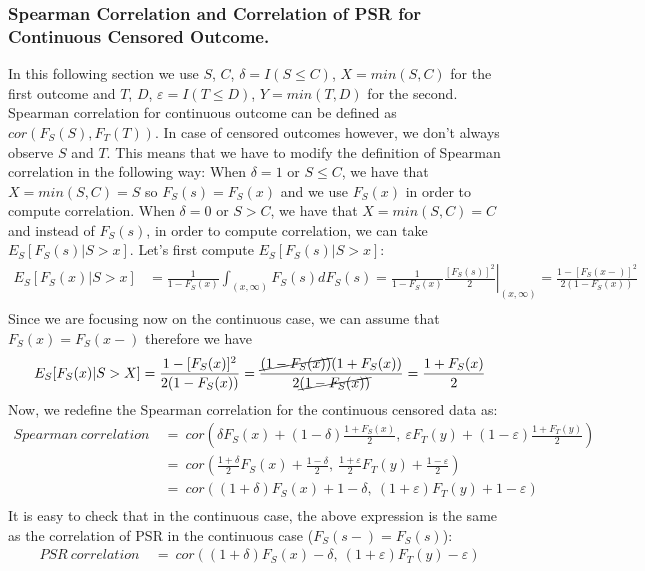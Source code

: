 \documentclass[]{article}
\let\epsilon\varepsilon
\begin{document}
\subsubsection{Spearman Correlation and Correlation of PSR for Continuous Censored Outcome.}
In this following section we use $S$, $C$, $\delta=I(S\leq C)$, $X = min(S, C)$ for the first outcome and $T$, $D$, $\epsilon=I(T\leq D)$, $Y = min(T, D)$ for the second.\\
Spearman correlation for continuous outcome can be defined as $cor(F_S(S), F_T(T))$. In case of censored outcomes however, we don't always observe $S$ and $T$. This means that we have to modify the definition of Spearman correlation in the following way: When $\delta = 1$ or $S\leq C$, we have that $X = min(S, C)=S$ so $F_S(s)=F_S(x)$ and we use $F_S(x)$ in order to compute correlation. When $\delta = 0$ or $S > C$, we have that $X = min(S, C)=C$ and instead of $F_S(s)$, in order to compute correlation, we can take $E_S[F_S(s)|S>x]$. Let's first compute $E_S[F_S(s)|S>x]$:
	$$
	\begin{aligned}
		E_S[F_S(x)|S>x] &= \frac{1}{1-F_S(x)}\int_{(x, \infty)} F_S(s)dF_S(s) = \frac{1}{1-F_S(x)} \left.\frac{ [F_S(s)]^2}{2}\right|_{(x, \infty)} = \frac{1-[F_S(x-)]^2}{2(1-F_S(x))} \\
	\end{aligned}
	$$
Since we are focusing now on the continuous case, we can assume that $F_S(x)=F_S(x-)$ therefore we have
	$$
	\begin{aligned}
		E_S[F_S(x)|S>X] &=\frac{1-[F_S(x)]^2}{2(1-F_S(x))}=\frac{\cancel{(1-F_S(x))}(1+F_S(x))}{2\cancel{(1-F_S(x))}}  = \frac{1+F_S(x)}{2} \\
	\end{aligned}
	$$
Now, we redefine the Spearman correlation for the continuous censored data as:
	$$
	\begin{aligned}
		Spearman~correlation~&=~ cor\left(  \delta F_S(x) + (1-\delta) \frac{1+F_S(x)}{2},~\epsilon F_T(y) + (1-\epsilon) \frac{1+F_T(y)}{2}  \right)\\
		&=~ cor\left(  \frac{1+\delta}{2}F_S(x) +  \frac{1-\delta}{2},~\frac{1+\epsilon}{2}F_T(y) +  \frac{1-\epsilon}{2}  \right)\\
		&=~ cor\left(  (1+\delta)F_S(x) +  1-\delta,~(1+\epsilon)F_T(y) +  1-\epsilon  \right)\\
	\end{aligned}
	$$
It is easy to check that in the continuous case, the above expression is the same as the correlation of PSR in the continuous case ($F_S(s-) = F_S(s)$):
	$$
	\begin{aligned}
		PSR~correlation~&=~ cor\left(  (1+\delta)F_S(x) -\delta,~(1+\epsilon)F_T(y) -\epsilon  \right)\\
	\end{aligned}
	$$
\end{document}
